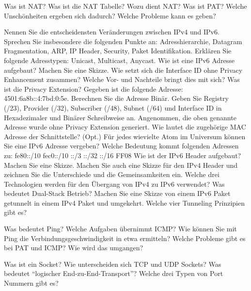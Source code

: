 \documentclass[ngerman,a4paper,12pt]{scrreprt}
\begin{document}
\olR
	\li Was ist NAT? Was ist die NAT Tabelle?
	\li Wozu dient NAT?
	\li Was ist PAT? Welche Unschönheiten ergeben sich dadurch? Welche Probleme kann es geben?
\olS


\olR
	\li Nennen Sie die entscheidensten Veränderungen zwischen IPv4 und IPv6. Sprechen Sie insbesondere die folgenden Punkte an: Adresshierarchie, Datagram Fragmentation, ARP, IP Header, Security, Paket Identifikation.
	\li Erklären Sie folgende Adresstypen: Unicast, Multicast, Anycast.
	\li Wie ist eine IPv6 Adresse aufgebaut? Machen Sie eine Skizze.
	\li Wie setzt sich die Interface ID ohne Privacy Enhancement zusammen? Welche Vor- und Nachteile bringt dies mit sich?
	\li Was ist die Privacy Extension?
	\li Gegeben ist die folgende Adresse: 4501:6a8b::4:7bd:0:5e. Berechnen Sie die Adresse Binär. Geben Sie Registry (/23), Provider (/32), Subscriber (/48), Subnet (/64) und Interface ID in Hexadezimaler und Binärer Schreibweise an.
	\li Angenommen, die oben genannte Adresse wurde ohne Privacy Extension generiert. Wie lautet die zugehörige MAC Adresse der Schnittstelle?
	\li (Opt.) Für jedes wievielte Atom im Universum können Sie eine IPv6 Adresse vergeben?
	\li Welche Bedeutung kommt folgenden Adressen zu:
		\ol
			\li fe80::/10
			\li fec0::/10
			\li 2000::/3
			::/32
			::/16
			\li FF08
		\olE
	\li Wie ist der IPv6 Header aufgebaut? Machen Sie eine Skizze. Machen Sie auch eine Skizze für den IPv4 Header und zeichnen Sie die Unterschiede und die Gemeinsamkeiten ein.
	\li Welche drei Technologien werden für den Übergang von IPv4 zu IPv6 verwendet?
	\li Was bedeutet Dual-Stack Betrieb?
	\li Machen Sie eine Skizze von einem IPv6 Paket getunnelt in einem IPv4 Paket und umgekehrt.
	\li Welche vier Tunneling Prinzipien gibt es?
\olS


\olR
	\li Was bedeutet Ping?
	\li Welche Aufgaben übernimmt ICMP?
	\li Wie können Sie mit Ping die Verbindungsgeschwindigkeit in etwa ermitteln?
	\li Welche Probleme gibt es bei PAT und ICMP? Wie wird das umgangen?
\olS


\olR
	\li Was ist ein Socket? Wie unterscheiden sich TCP und UDP Sockets?
	\li Was bedeutet "`logischer End-zu-End-Transport"'?
	\li Welche drei Typen von Port Nummern gibt es?
\olS
\end{document}
